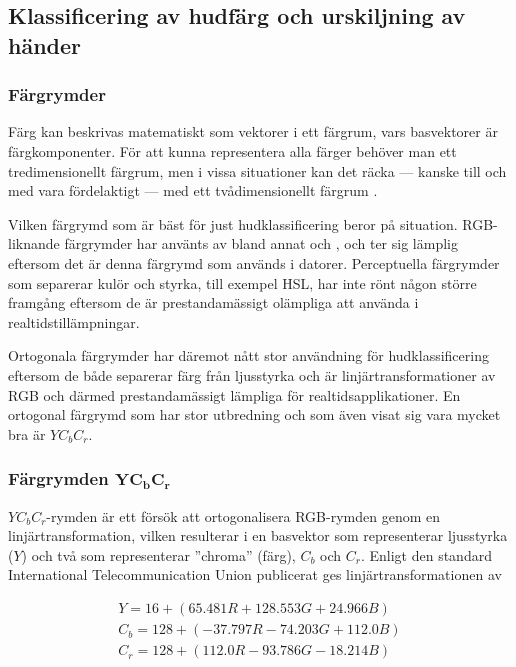 \documentclass[../rapport_MVEX01-11-05]{subfiles}
\begin{document}
\subsection{Klassificering av hudfärg och urskiljning av händer}\label{sec:hudklassificering}

\subsubsection{Färgrymder}

Färg kan beskrivas matematiskt som vektorer i ett färgrum, vars
basvektorer är färgkomponenter. För att kunna representera alla färger
behöver man ett tredimensionellt färgrum, men i vissa situationer kan
det räcka --- kanske till och med vara fördelaktigt --- med ett
tvådimensionellt färgrum \cite{Kakumanu07}.

Vilken färgrymd som är bäst för just hudklassificering beror på
situation. RGB-liknande färgrymder har använts av bland annat
 och , och ter sig lämplig
eftersom det är denna färgrymd som används i datorer. Perceptuella
färgrymder som separerar kulör och styrka, till exempel HSL, har inte
rönt någon större framgång eftersom de är prestandamässigt olämpliga
att använda i realtidstillämpningar.

Ortogonala färgrymder har däremot nått stor användning för
hudklassificering \cite{Hsu02,Elmezain08,Hassanpour08} eftersom de
både separerar färg från ljusstyrka och är linjärtransformationer av
RGB och därmed prestandamässigt lämpliga för realtidsapplikationer.
En ortogonal färgrymd som har stor utbredning och som även visat
sig vara mycket bra \cite{Kakumanu07} är $YC_bC_r$.

\subsubsection[Färgrymden $\mathrm{YC_bC_r}$]{Färgrymden $\mathbf{YC_bC_r}$}

$YC_bC_r$-rymden är ett försök att ortogonalisera RGB-rymden genom en
linjärtransformation, vilken resulterar i en basvektor som
representerar ljusstyrka ($Y$) och två som representerar ''chroma''
(färg), $C_b$ och $C_r$. Enligt den standard International
Telecommunication Union publicerat \cite{ITU-BT601} ges
linjärtransformationen av

\begin{equation*}
  \label{eq:farg:ycbcr}
  \begin{gathered}
  Y   = 16  + ( 65.481R + 128.553G + 24.966B)\\
  C_b = 128 + (-37.797R - 74.203G  + 112.0B )\\
  C_r = 128 + (112.0R   - 93.786G  - 18.214B)
  \end{gathered}
\end{equation*}
\end{document}
